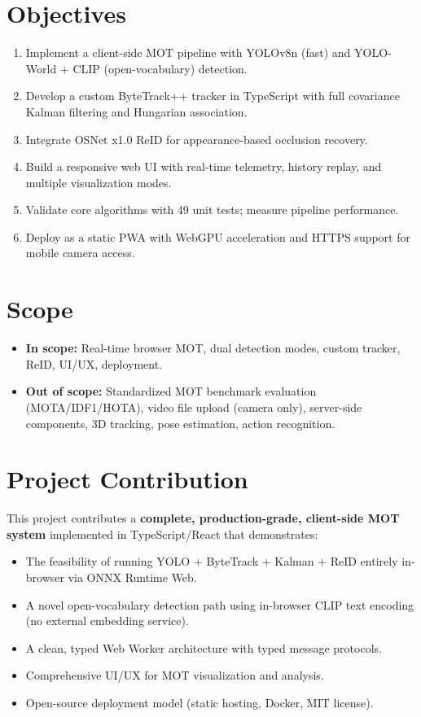 \section{Objectives}
\label{sec:objectives}

\begin{enumerate}
    \item Implement a client-side MOT pipeline with YOLOv8n (fast) and YOLO-World + CLIP (open-vocabulary) detection.
    \item Develop a custom ByteTrack++ tracker in TypeScript with full covariance Kalman filtering and Hungarian association.
    \item Integrate OSNet x1.0 ReID for appearance-based occlusion recovery.
    \item Build a responsive web UI with real-time telemetry, history replay, and multiple visualization modes.
    \item Validate core algorithms with 49 unit tests; measure pipeline performance.
    \item Deploy as a static PWA with WebGPU acceleration and HTTPS support for mobile camera access.
\end{enumerate}

\section{Scope}
\label{sec:scope}

\begin{itemize}
    \item \textbf{In scope:} Real-time browser MOT, dual detection modes, custom tracker, ReID, UI/UX, deployment.
    \item \textbf{Out of scope:} Standardized MOT benchmark evaluation (MOTA/IDF1/HOTA), video file upload (camera only), server-side components, 3D tracking, pose estimation, action recognition.
\end{itemize}

\section{Project Contribution}
\label{sec:contribution}

This project contributes a \textbf{complete, production-grade, client-side MOT system} implemented in TypeScript/React that demonstrates:
\begin{itemize}
    \item The feasibility of running YOLO + ByteTrack + Kalman + ReID entirely in-browser via ONNX Runtime Web.
    \item A novel open-vocabulary detection path using in-browser CLIP text encoding (no external embedding service).
    \item A clean, typed Web Worker architecture with typed message protocols.
    \item Comprehensive UI/UX for MOT visualization and analysis.
    \item Open-source deployment model (static hosting, Docker, MIT license).
\end{itemize}